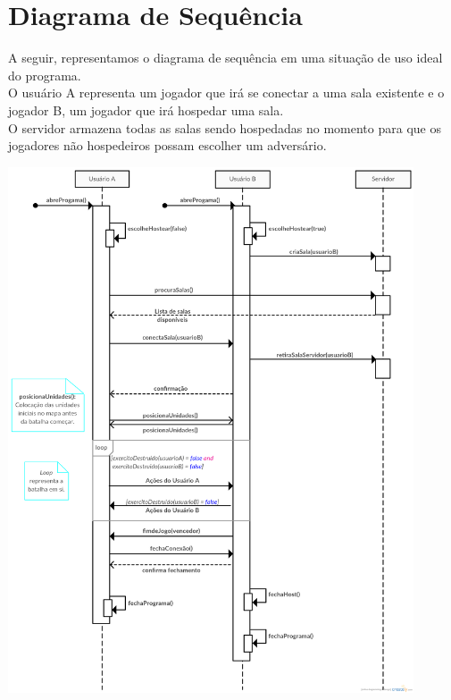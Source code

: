 \section{Diagrama de Sequência}

A seguir, representamos o diagrama de sequência em uma situação de uso
ideal do programa.\\

O usuário A representa um jogador que irá se conectar a uma sala existente
e o jogador B, um jogador que irá hospedar uma sala.\\

O servidor armazena todas as salas sendo hospedadas no momento para que os
jogadores não hospedeiros possam escolher um adversário.

\begin{centre} 
    \includegraphics[width=0.9\textwidth]{sequence-diagram.png}
\end{centre}
